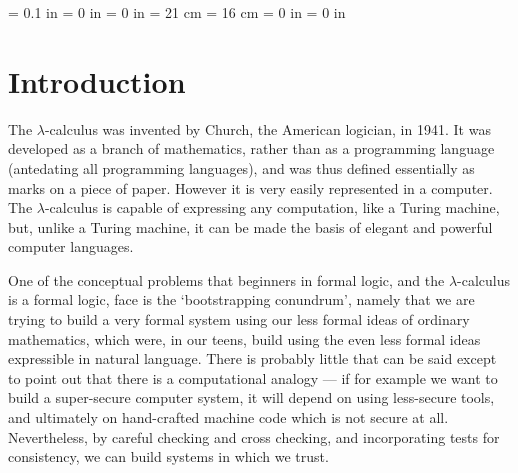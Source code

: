 


\parskip = 0.1 in
\parindent = 0 in
\topmargin = 0 in
\textheight= 21 cm
\textwidth = 16 cm
\oddsidemargin = 0 in
\evensidemargin = 0 in

\newcommand{\LC}{$\lambda$-calculus }
\newcommand{\reducesto}{\longrightarrow}
\newcommand{\comment}[1]{}









\section{Introduction}

The \LC was invented by Church, the American logician, in 1941. It was
developed as a branch of mathematics, rather than as a programming language
(antedating all programming languages), and was thus defined
essentially as marks on a piece of paper. However it is very easily
represented in a computer. The \LC is capable of expressing any
computation, like a Turing machine, but, unlike a Turing machine, it can be
made the basis of elegant and powerful computer languages.


One of the conceptual problems that beginners in formal logic, and
the \LC is a formal logic, face is the `bootstrapping conundrum', namely
that we are trying to build a very formal system using our less formal
ideas of ordinary mathematics, which were, in our teens, build using the
even less formal ideas expressible in natural language. There is probably
little that can be said except to point out that there is a computational
analogy --- if for example we want to build a super-secure computer system,
it will depend on using less-secure tools, and ultimately on hand-crafted
machine code which is not secure at all. Nevertheless, by careful checking
and cross checking, and incorporating tests for consistency, we can build
systems in which we trust.

